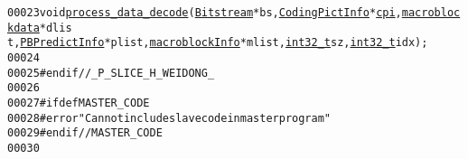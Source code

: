 \begin{footnotesize}
\begin{alltt}
00023 \textcolor{keywordtype}{void} \hyperlink{_p_slice_8cpp_aa96fb8edf03d2055a439bb9fefd52a10}{process_data_decode}(\hyperlink{struct_bitstream}{Bitstream} *bs, \hyperlink{struct_coding_pict_info}{CodingPictInfo} *\hyperlink{structtag__macroblock__info_ae7a0c6b68c7cbc0ffb1a82799eb386ef}{cpi}, \hyperlink{structmacroblockdata}{macroblockdata} *dlis
      t, \hyperlink{struct_p_b_predict_info}{PBPredictInfo} *plist, \hyperlink{structmacroblock_info}{macroblockInfo} *mlist, \hyperlink{_types_8h_a115ba3a1b24a8702355c5dbd61ce01e0}{int32_t} sz, \hyperlink{_types_8h_a115ba3a1b24a8702355c5dbd61ce01e0}{int32_t} idx);
00024 
00025 \textcolor{preprocessor}{#endif // \_P\_SLICE\_H\_WEIDONG\_}
00026 \textcolor{preprocessor}{}
00027 \textcolor{preprocessor}{#ifdef MASTER\_CODE}
00028 \textcolor{preprocessor}{}\textcolor{preprocessor}{#error "Can not include slave code in master program"}
00029 \textcolor{preprocessor}{}\textcolor{preprocessor}{#endif // MASTER\_CODE}
00030 \textcolor{preprocessor}{}
\end{alltt}\end{footnotesize}
